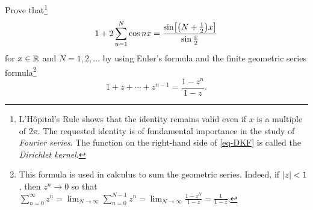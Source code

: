 \documentclass{../math135}
\begin{document}
\begin{exercise}
	Prove that\footnote{L'H\^opital's Rule shows that the identity
    remains valid even if \(x\) is a multiple of \(2\pi\).  The
    requested identity is of fundamental importance in the study of
    \emph{Fourier series}.  The function on the right-hand side of
    \eqref{eq-DKF} is called the \emph{Dirichlet kernel}.}
  \begin{equation}
		1 + 2 \sum_{n=1}^N \cos nx
    = \frac{\sin \sbr*{\prn*{N + \frac 1 2} x}}{\sin \frac{x}{2}}
    \label{eq-DKF}
  \end{equation}
	for \(x \in \mathbb R\) and \(N = 1,2,\dots\) by using Euler's formula and
  the finite geometric series formula\footnote{This formula is used in
    calculus to sum the geometric series.  Indeed, if \(\lvert z\rvert < 1\),
    then \(z^n \to 0\) so that
    \(\sum_{n=0}^{\infty} z^n = \lim_{N\to\infty} \sum_{n=0}^{N-1} z^n
    = \lim_{N\to\infty}\frac{1 - z^N}{1-z} = \frac{1}{1-z}\).}
	\begin{equation*}
		1+ z + \cdots + z^{n-1} = \frac{1-z^n}{1-z}.
	\end{equation*}

  \begin{solution}
  \end{solution}

\end{exercise}
\end{document}
